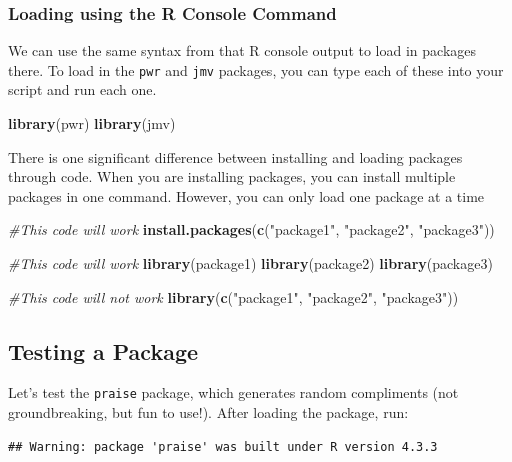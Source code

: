 \documentclass[
]{book}
\newenvironment{Shaded}{\begin{snugshade}}{\end{snugshade}}
\newcommand{\CommentTok}[1]{\textcolor[rgb]{0.56,0.35,0.01}{\textit{#1}}}
\newcommand{\FunctionTok}[1]{\textcolor[rgb]{0.13,0.29,0.53}{\textbf{#1}}}
\newcommand{\NormalTok}[1]{#1}
\newcommand{\StringTok}[1]{\textcolor[rgb]{0.31,0.60,0.02}{#1}}
\begin{document}
\subsubsection{Loading using the R Console Command}\label{loading-using-the-r-console-command}

We can use the same syntax from that R console output to load in packages there. To load in the \texttt{pwr} and \texttt{jmv} packages, you can type each of these into your script and run each one.

\begin{Shaded}
\begin{Highlighting}[]
\FunctionTok{library}\NormalTok{(pwr)}
\FunctionTok{library}\NormalTok{(jmv)}
\end{Highlighting}
\end{Shaded}

There is one significant difference between installing and loading packages through code. When you are installing packages, you can install multiple packages in one command. However, you can only load one package at a time

\begin{Shaded}
\begin{Highlighting}[]
\CommentTok{\#This code will work}
\FunctionTok{install.packages}\NormalTok{(}\FunctionTok{c}\NormalTok{(}\StringTok{"package1"}\NormalTok{, }\StringTok{"package2"}\NormalTok{, }\StringTok{"package3"}\NormalTok{)) }


\CommentTok{\#This code will work}
\FunctionTok{library}\NormalTok{(package1)}
\FunctionTok{library}\NormalTok{(package2)}
\FunctionTok{library}\NormalTok{(package3)}


\CommentTok{\#This code will not work}
\FunctionTok{library}\NormalTok{(}\FunctionTok{c}\NormalTok{(}\StringTok{"package1"}\NormalTok{, }\StringTok{"package2"}\NormalTok{, }\StringTok{"package3"}\NormalTok{)) }
\end{Highlighting}
\end{Shaded}

\subsection{Testing a Package}\label{testing-a-package}

Let's test the \texttt{praise} package, which generates random compliments (not groundbreaking, but fun to use!). After loading the package, run:

\begin{verbatim}
## Warning: package 'praise' was built under R version 4.3.3
\end{verbatim}
\end{document}
